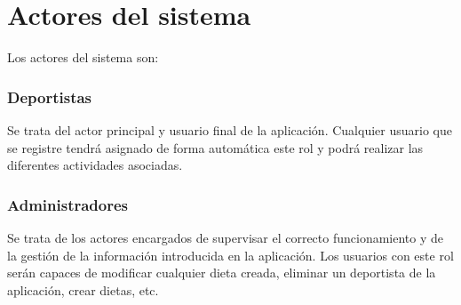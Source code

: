 \section{Actores del sistema}
Los actores del sistema son:

\subsubsection{Deportistas}
Se trata del actor principal y usuario final de la aplicación. Cualquier usuario que se registre tendrá asignado de forma automática este rol y podrá realizar las diferentes actividades asociadas.

\subsubsection{Administradores}
Se trata de los actores encargados de supervisar el correcto funcionamiento y de la gestión de la información introducida en la aplicación. Los usuarios con este rol serán capaces de modificar cualquier dieta creada, eliminar un deportista de la aplicación, crear dietas, etc.